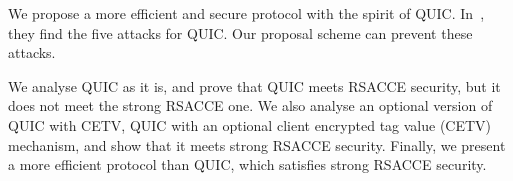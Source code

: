 We propose a more efficient and secure protocol with
the spirit of QUIC.
In~\cite{LJBN15:QUIC}, they find the five attacks for
QUIC.
Our proposal scheme can prevent these attacks.

We analyse QUIC as it is, and prove that QUIC meets
RSACCE security, but it does not meet the strong
RSACCE one.
We also analyse an optional version of QUIC with CETV,
QUIC with an optional client encrypted tag value (CETV)
mechanism, and show that it meets strong RSACCE security.
Finally, we present a more efficient protocol than QUIC,
which satisfies strong RSACCE security.